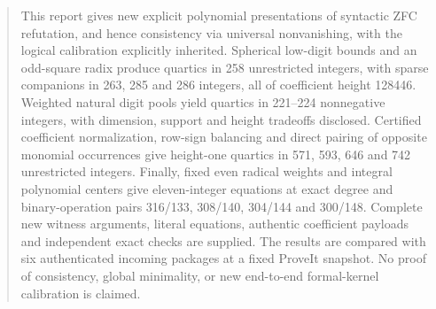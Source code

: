 \begin{abstract}
This report gives new explicit polynomial presentations of syntactic
ZFC refutation, and hence consistency via universal nonvanishing, with the
logical calibration explicitly inherited. Spherical low-digit bounds and an
odd-square radix produce quartics in 258 unrestricted integers, with sparse
companions in 263, 285 and 286 integers, all of coefficient height 128446.
Weighted natural digit pools yield quartics in 221--224 nonnegative integers,
with dimension, support and height tradeoffs disclosed. Certified coefficient
normalization, row-sign balancing and direct pairing of opposite monomial
occurrences give height-one quartics in 571, 593, 646 and 742 unrestricted
integers. Finally, fixed even radical weights and integral polynomial centers
give eleven-integer equations at exact degree and binary-operation pairs
316/133, 308/140, 304/144 and 300/148. Complete new witness arguments,
literal equations, authentic coefficient payloads and independent exact
checks are supplied. The results are compared with six authenticated incoming
packages at a fixed ProveIt snapshot. No proof of consistency, global
minimality, or new end-to-end formal-kernel calibration is claimed.
\end{abstract}
